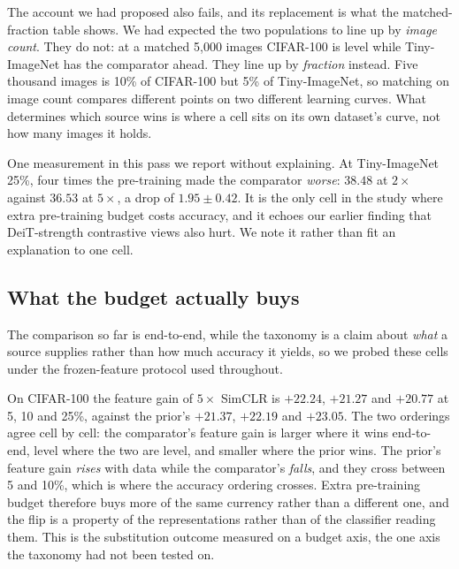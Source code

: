 The account we had proposed also fails, and its replacement is what the
matched-fraction table shows. We had expected the two populations to line up
by \emph{image count}. They do not: at a matched 5{,}000 images CIFAR-100 is
level while Tiny-ImageNet has the comparator ahead. They line up by
\emph{fraction} instead. Five thousand images is 10\% of CIFAR-100 but 5\%
of Tiny-ImageNet, so matching on image count compares different points on
two different learning curves. What determines which source wins is where a
cell sits on its own dataset's curve, not how many images it holds.

One measurement in this pass we report without explaining. At
Tiny-ImageNet 25\%, four times the pre-training made the comparator
\emph{worse}: $38.48$ at $2\times$ against $36.53$ at $5\times$, a drop of
$1.95 \pm 0.42$. It is the only cell in the study where extra pre-training
budget costs accuracy, and it echoes our earlier finding that
DeiT-strength contrastive views also hurt. We note it rather than fit an
explanation to one cell.

\subsection{What the budget actually buys}\label{sec:budget:features}
The comparison so far is end-to-end, while the taxonomy is a claim about
\emph{what} a source supplies rather than how much accuracy it yields, so we
probed these cells under the frozen-feature protocol used throughout.

On CIFAR-100 the feature gain of $5\times$ SimCLR is $+22.24$, $+21.27$ and
$+20.77$ at 5, 10 and 25\%, against the prior's $+21.37$, $+22.19$ and
$+23.05$. The two orderings agree cell by cell: the comparator's feature
gain is larger where it wins end-to-end, level where the two are level, and
smaller where the prior wins. The prior's feature gain \emph{rises} with
data while the comparator's \emph{falls}, and they cross between 5 and
10\%, which is where the accuracy ordering crosses. Extra pre-training
budget therefore buys more of the same currency rather than a different one,
and the flip is a property of the representations rather than of the
classifier reading them. This is the substitution outcome measured on a
budget axis, the one axis the taxonomy had not been tested on.

